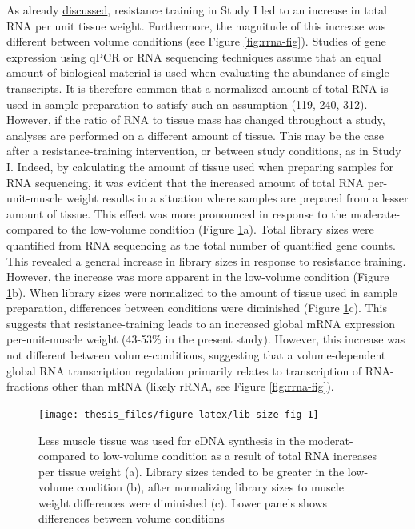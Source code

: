 \documentclass[twoside,10pt]{gihclass} %
\begin{document}
As already \protect\hyperlink{muscle-mass-growth}{discussed}, resistance training in Study I led to an increase in total RNA per unit tissue weight. Furthermore, the magnitude of this increase was different between volume conditions (see Figure \ref{fig:rrna-fig}).
Studies of gene expression using qPCR or RNA sequencing techniques assume that an equal amount of biological material is used when evaluating the abundance of single transcripts.
It is therefore common that a normalized amount of total RNA is used in sample preparation to satisfy such an assumption
(119, 240, 312).
However, if the ratio of RNA to tissue mass has changed throughout a study, analyses are performed on a different amount of tissue. This may be the case after a resistance-training intervention, or between study conditions, as in Study I.
Indeed, by calculating the amount of tissue used when preparing samples for RNA sequencing, it was evident that the increased amount of total RNA per-unit-muscle weight results in a situation where samples are prepared from a lesser amount of tissue.
This effect was more pronounced in response to the moderate- compared to the low-volume condition (Figure \ref{fig:lib-size-fig}a).
Total library sizes were quantified from RNA sequencing as the total number of quantified gene counts. This revealed a general increase in library sizes in response to resistance training. However, the increase was more apparent in the low-volume condition
(Figure \ref{fig:lib-size-fig}b).
When library sizes were normalized to the amount of tissue used in sample preparation, differences between conditions were diminished
(Figure \ref{fig:lib-size-fig}c).
This suggests that resistance-training leads to an increased global mRNA expression per-unit-muscle weight (43-53\% in the present study). However, this increase was not different between volume-conditions, suggesting that a volume-dependent global RNA transcription regulation primarily relates to transcription of RNA-fractions other than mRNA (likely rRNA, see Figure \ref{fig:rrna-fig}).
\begin{figure}

{\centering \texttt{[image: thesis\_files/figure-latex/lib-size-fig-1]} 

}

\caption[Muscle weight and RNA-seq library size]{Less muscle tissue was used for cDNA synthesis in the moderat- compared to low-volume condition as a result of total RNA increases per tissue weight (a). Library sizes tended to be greater in the low-volume condition (b), after normalizing library sizes to muscle weight differences were diminished (c). Lower panels shows differences between volume conditions}\label{fig:lib-size-fig}
\end{figure}
\end{document}
